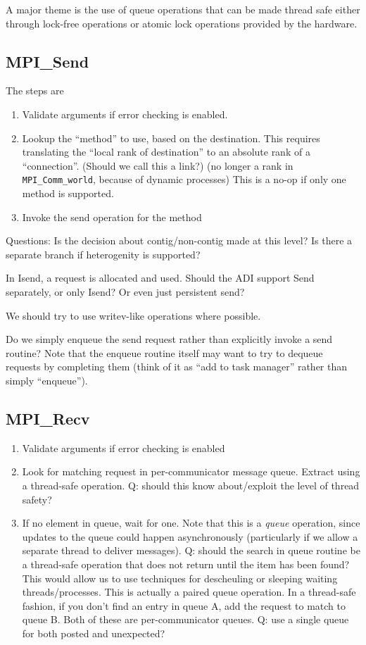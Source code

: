 \documentclass{article}
\let\code=\texttt
\begin{document}
A major theme is the use of queue operations that can be made thread safe
either 
through lock-free operations or atomic lock operations provided by the
hardware.  

\subsection{MPI\_Send}
The steps are
\begin{enumerate}
\item Validate arguments if error checking is enabled.
\item Lookup the ``method'' to use, based on the destination.  This requires
  translating the ``local rank of destination'' to an absolute rank of a
  ``connection''. (Should we call this a link?)  (no longer a rank in \code{MPI\_Comm\_world}, because of
  dynamic processes) This is a no-op
  if only one method is supported.
\item Invoke the send operation for the method
\end{enumerate}
Questions: Is the decision about contig/non-contig made at this level?
Is there a separate branch if heterogenity is supported?  

In Isend, a request is allocated and used.  Should the ADI support Send
separately, or only Isend?  Or even just persistent send?

We should try to use writev-like operations where possible.

Do we simply enqueue the send request rather than explicitly invoke a send
routine?  Note that the enqueue routine itself may want to try to dequeue
requests by completing them (think of it as ``add to task manager'' rather
than simply ``enqueue'').

\subsection{MPI\_Recv}
\begin{enumerate}
\item Validate arguments if error checking is enabled
\item Look for matching request in per-communicator message queue.  Extract
  using a thread-safe operation.  Q: should this know about/exploit the level
  of thread safety?
\item If no element in queue, wait for one.  Note that this is a \emph{queue}
  operation, since updates to the queue could happen asynchronously
  (particularly if we allow a separate thread to deliver messages).  Q: should
  the search in queue routine be a thread-safe operation that does not return
  until the item has been found?  This would allow us to use techniques for
  descheuling or sleeping waiting threads/processes.
  This is actually a paired queue operation.  In a thread-safe fashion, if you
  don't find an entry in queue A, add the request to match to queue B.  Both
  of these are per-communicator queues.  Q: use a single queue for both posted
  and unexpected?
\end{enumerate}
\end{document}
